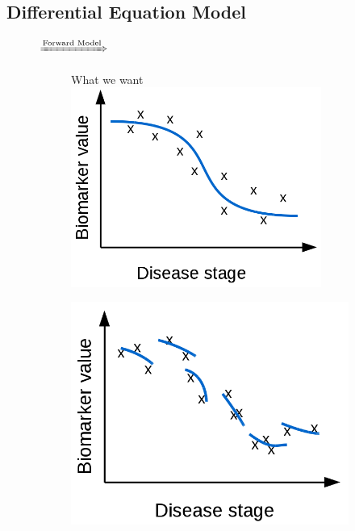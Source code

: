 \subsection{Differential Equation Model}
\label{sec:bckDem}


\begin{figure}[h]
 \centering
 
 \par{\huge $\xRightarrow{\text{Forward Model}}$}
 
 \begin{subfigure}{0.3\textwidth}
    \centering
    What we want\\
    \vspace{1em}
    \includegraphics[width=0.90\textwidth]{images/demNewFigs/fig1.png}
    \vspace{1em}
 \end{subfigure}
 \begin{subfigure}{0.3\textwidth}
     \centering
     \vspace{1em}
     \includegraphics[width=\textwidth]{images/demNewFigs/fig2.png}

\end{subfigure}
\end{figure}
